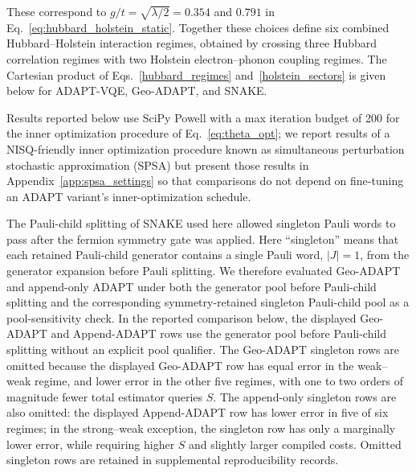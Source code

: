 \documentclass[
  reprint,
  amsmath,
  amssymb,
  aps,
  pra,
  nofootinbib,
  superscriptaddress,
  floatfix
]{revtex4-2}
\begin{document}
These correspond to \(g/t=\sqrt{\lambda/2}=0.354\) and \(0.791\) in Eq.~\eqref{eq:hubbard_holstein_static}. Together these choices define six combined Hubbard--Holstein interaction regimes, obtained by crossing three Hubbard correlation regimes with two Holstein electron--phonon coupling regimes. The Cartesian product of Eqs.~\eqref{hubbard_regimes} and~\eqref{holstein_sectors} is given below for ADAPT-VQE, Geo-ADAPT, and SNAKE.


Results reported below use SciPy Powell with a max iteration budget of 200 for the inner optimization procedure of Eq.~\eqref{eq:theta_opt}; we report results of a NISQ-friendly inner optimization procedure known as simultaneous perturbation stochastic approximation (SPSA) but present those results in Appendix~\ref{app:spsa_settings} so that comparisons do not depend on fine-tuning an ADAPT variant's inner-optimization schedule. 

The Pauli-child splitting of SNAKE used here allowed singleton Pauli words to pass after the fermion symmetry gate was applied. Here ``singleton'' means that each retained Pauli-child generator contains a single Pauli word, \(|J|=1\), from the generator expansion before Pauli splitting. We therefore evaluated Geo-ADAPT and append-only ADAPT under both the generator pool before Pauli-child splitting and the corresponding symmetry-retained singleton Pauli-child pool as a pool-sensitivity check. In the reported comparison below, the displayed Geo-ADAPT and Append-ADAPT rows use the generator pool before Pauli-child splitting without an explicit pool qualifier. The Geo-ADAPT singleton rows are omitted because the displayed Geo-ADAPT row has equal error in the weak--weak regime, and lower error in the other five regimes, with one to two orders of magnitude fewer total estimator queries \(S\). The append-only singleton rows are also omitted: the displayed Append-ADAPT row has lower error in five of six regimes; in the strong--weak exception, the singleton row has only a marginally lower error, while requiring higher \(S\) and slightly larger compiled costs. Omitted singleton rows are retained in supplemental reproducibility records.
\end{document}
